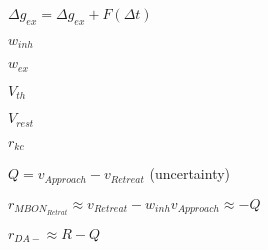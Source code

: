 $\Delta g_{ex} = \Delta g_{ex} + F(\Delta t)$

$w_{inh}$

$w_{ex}$

$V_{th}$

$V_{rest}$

$r_{kc}$

$Q = v_{Approach} - v_{Retreat}$ (uncertainty)


$r_{MBON_{Retrat}} \approx v_{Retreat} - w_{inh} v_{Approach} \approx -Q $ 

$r_{DA-} \approx R-Q$ 